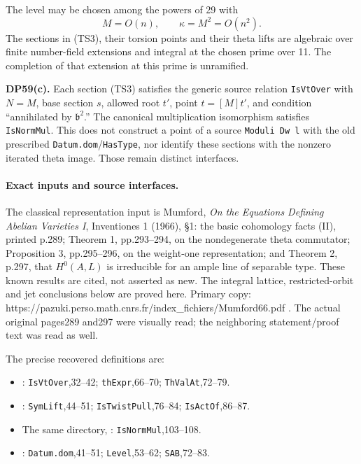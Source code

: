 \begin{theorem}
The level may be chosen among the powers of 29 with \[
 M=O(n),\qquad \kappa=M^2=O(n^2).
 \tag{TS6}
\] The sections in (TS3), their torsion points and their theta lifts are algebraic over finite number-field extensions and integral at the chosen prime over 11. The completion of that extension at this prime is unramified.

\textbf{DP59(c).} Each section (TS3) satisfies the generic source relation \texttt{IsVtOver} with \(N=M\), base section \(s\), allowed root \(t'\), point \(t=[M]t'\), and condition ``annihilated by \(\mathfrak b^2\).'' The canonical multiplication isomorphism satisfies \texttt{IsNormMul}. This does not construct a point of a source \texttt{Moduli\ Dw\ l} with the old prescribed \texttt{Datum.dom}/\texttt{HasType}, nor identify these sections with the nonzero iterated theta image. Those remain distinct interfaces.
\end{theorem}

\paragraph{Exact inputs and source interfaces.}
The classical representation input is Mumford, \emph{On the Equations Defining Abelian Varieties I}, Inventiones 1 (1966), §1: the basic cohomology facts (II), printed p.289; Theorem 1, pp.293--294, on the nondegenerate theta commutator; Proposition 3, pp.295--296, on the weight-one representation; and Theorem 2, p.297, that \(H^0(A,L)\) is irreducible for an ample line of separable type. These known results are cited, not asserted as new. The integral lattice, restricted-orbit and jet conclusions below are proved here. Primary copy: https://pazuki.perso.math.cnrs.fr/index\_fichiers/Mumford66.pdf . The actual original pages289 and297 were visually read; the neighboring statement/proof text was read as well.

The precise recovered definitions are:

\begin{itemize}
\item
  : \texttt{IsVtOver},32--42; \texttt{thExpr},66--70; \texttt{ThValAt},72--79.
\item
  : \texttt{SymLift},44--51; \texttt{IsTwistPull},76--84; \texttt{IsActOf},86--87.
\item
  The same directory, : \texttt{IsNormMul},103--108.
\item
  : \texttt{Datum.dom},41--51; \texttt{Level},53--62; \texttt{SAB},72--83.
\end{itemize}

